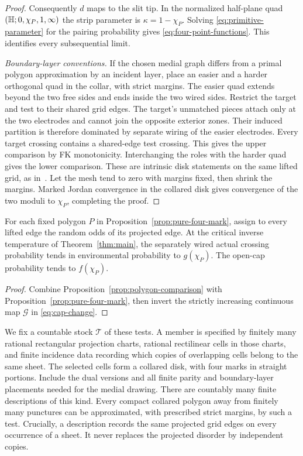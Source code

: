 \begin{proof}
Consequently $d$ maps to the slit tip. In the normalized half-plane
quad $(\mathbb H;0,\chi_P,1,\infty)$ the strip parameter is
$\kappa=1-\chi_P$. Solving \eqref{eq:primitive-parameter} for the
pairing probability gives \eqref{eq:four-point-functions}.
This identifies every subsequential limit.

\emph{Boundary-layer conventions.}
If the chosen medial graph differs from a primal polygon approximation
by an incident layer, place an easier and a harder orthogonal quad in
the collar, with strict margins. The easier quad extends beyond the
two free sides and ends inside the two wired sides. Restrict the target
and test to their shared grid edges. The target's unmatched pieces
attach only at the two electrodes and cannot join the opposite exterior
zones. Their induced partition is therefore dominated by separate
wiring of the easier electrodes. Every target crossing contains a
shared-edge test crossing. This gives the upper comparison by FK
monotonicity. Interchanging the roles with the harder quad gives the
lower comparison. These are intrinsic disk statements on the same
lifted grid, as in~\cite[Proposition ``Jordan-quad transfer'']{C}.
Let the mesh tend to zero with margins fixed, then shrink the margins.
Marked Jordan convergence in the collared disk gives convergence of
the two moduli to $\chi_P$, completing the proof.
\end{proof}

\begin{corollary}\label{cor:fixed-tests}
For each fixed polygon $P$ in Proposition~\ref{prop:pure-four-mark},
assign to every lifted edge the random odds of its projected edge.
At the critical inverse temperature of Theorem~\ref{thm:main}, the
separately wired actual crossing probability tends in environmental
probability to $g(\chi_P)$. The open-cap probability tends to $f(\chi_P)$.
\end{corollary}

\begin{proof}
Combine Proposition~\ref{prop:polygon-comparison} with
Proposition~\ref{prop:pure-four-mark}, then invert the strictly increasing
continuous map $\mathcal G$ in \eqref{eq:cap-change}.
\end{proof}

We fix a countable stock $\mathscr T$ of these tests. A member is
specified by finitely many rational rectangular projection charts,
rational rectilinear cells in those charts, and finite incidence data
recording which copies of overlapping cells belong to the same sheet.
The selected cells form a collared disk, with four marks in straight
portions. Include the dual versions and all finite parity and boundary-layer
placements needed for the medial drawing. There are countably many
finite descriptions of this kind. Every compact collared polygon away
from finitely many punctures can be approximated, with prescribed strict
margins, by such a test. Crucially, a description records the same
projected grid edges on every occurrence of a sheet. It never replaces
the projected disorder by independent copies.

